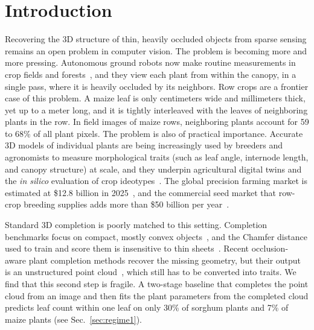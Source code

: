 \documentclass[10pt,twocolumn,letterpaper]{article}
\begin{document}
\section{Introduction}
\label{sec:intro}

Recovering the 3D structure of thin, heavily occluded objects from sparse sensing remains an open problem in computer vision. The problem is becoming more and more pressing. Autonomous ground robots now make routine measurements in crop fields and forests~\citep{kayacan2018terrasentia,muellersim2017robotanist,xu2022groundrobots,mattamala2024forest}, and they view each plant from within the canopy, in a single pass, where it is heavily occluded by its neighbors. Row crops are a frontier case of this problem. A maize leaf is only centimeters wide and millimeters thick, yet up to a meter long, and it is tightly interleaved with the leaves of neighboring plants in the row. In field images of maize rows, neighboring plants account for 59 to 68\% of all plant pixels. The problem is also of practical importance. Accurate 3D models of individual plants are being increasingly used by breeders and agronomists to measure morphological traits (such as leaf angle, internode length, and canopy structure) at scale, and they underpin agricultural digital twins and the \emph{in silico} evaluation of crop ideotypes~\citep{pylianidis2021digitaltwins,verdouw2021digitaltwins,soualiou2021fspm,hadadi2025procmaize, maizefield3d2025}. The global precision farming market is estimated at \$12.8 billion in 2025~\citep{bcc2025precisionfarming}, and the commercial seed market that row-crop breeding supplies adds more than \$50 billion per year~\citep{mordor2026seed}.


Standard 3D completion is poorly matched to this setting. Completion benchmarks focus on compact, mostly convex objects~\citep{yuan2018pcn,yu2021pointr}, and the Chamfer distance used to train and score them is insensitive to thin sheets~\citep{wu2021dcd, song2026structural}. Recent occlusion-aware plant completion methods recover the missing geometry, but their output is an unstructured point cloud~\citep{lee2026occ}, which still has to be converted into traits. We find that this second step is fragile. A two-stage baseline that completes the point cloud from an image and then fits the plant parameters from the completed cloud predicts leaf count within one leaf on only 30\% of sorghum plants and 7\% of maize plants (see Sec.~\ref{sec:regime1}).
\end{document}
